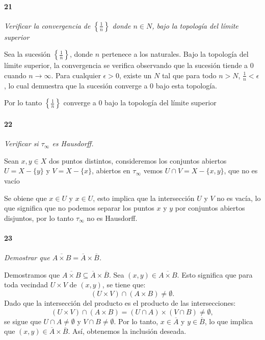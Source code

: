 \documentclass[12pt]{article}
\begin{document}
\paragraph{21}
\textit{Verificar la convergencia de $\left\{\frac{1}{n}\right\}$ donde $n \in N $, bajo la topolog\'ia del l\'imite superior }

Sea la sucesi\'on \(\left\{\frac{1}{n}\right\}\), donde \(n\) pertenece a los naturales. Bajo la topolog\'ia del l\'imite superior, la convergencia se verifica observando que la sucesi\'on tiende a 0 cuando \(n \to \infty\). Para cualquier \(\epsilon > 0\), existe un \(N\) tal que para todo \(n > N\), \(\frac{1}{n} < \epsilon\), lo cual demuestra que la sucesión converge a 0 bajo esta topolog\'ia. 

Por lo tanto \(\left\{\frac{1}{n}\right\}\) converge a 0 bajo la topolog\'ia del l\'imite superior

\paragraph{22}
\textit{Verificar si \(\tau_{\infty}\) es Hausdorff.}

Sean \(x, y \in X\) dos puntos distintos, consideremos los conjuntos abiertos \(U = X - \{y\}\) y \(V = X - \{x\}\), abiertos en \(\tau_{\infty}\)
vemos \(U \cap V = X - \{x, y\}\), que no es vac\'io

Se obiene que \(x \in U\) y \(x \in U\), esto implica que la intersecci\'on \(U\) y \(V\) no es vacía, lo que significa que no podemos separar los puntos
\(x\) y \(y\) por conjuntos abiertos disjuntos, por lo tanto \(\tau_{\infty}\) no es Hausdorff.

\paragraph{23}
\textit{Demostrar que \(\overline{A \times B} = \overline{A} \times \overline{B}\).}

Demostramos que $\overline{A \times B} \subseteq \overline{A} \times \overline{B}$. Sea $(x, y) \in \overline{A \times B}$. Esto significa que para toda vecindad $U \times V$ de $(x, y)$, se tiene que:
\[
(U \times V) \cap (A \times B) \neq \emptyset.
\]
Dado que la intersección del producto es el producto de las intersecciones:
\[
(U \times V) \cap (A \times B) = (U \cap A) \times (V \cap B) \neq \emptyset,
\]
se sigue que $U \cap A \neq \emptyset$ y $V \cap B \neq \emptyset$.
Por lo tanto, $x \in \overline{A}$ y $y \in \overline{B}$, lo que implica que $(x, y) \in \overline{A} \times \overline{B}$. Así, obtenemos la inclusión deseada.
\end{document}
